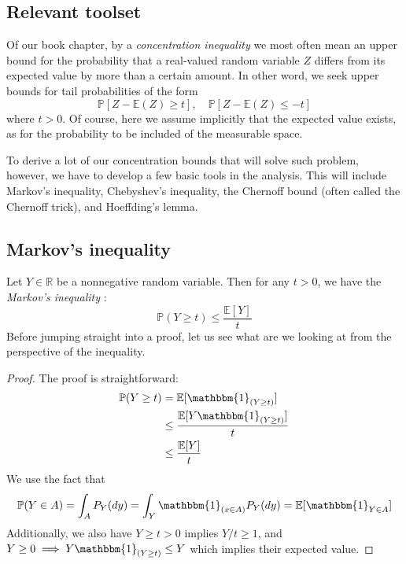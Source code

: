 \subsection{Relevant toolset}
Of our book chapter, by a \textit{concentration inequality} we most often mean an upper bound for the probability that a real-valued random variable $Z$ differs from its expected value by more than a certain amount. In other word, we seek upper bounds for tail probabilities of the form 
\begin{equation}
    \mathbb{P}[Z-\mathbb{E}(Z)\geq t], \quad \mathbb{P}[Z-\mathbb{E}(Z)\leq -t] 
\end{equation}
where $t>0$. Of course, here we assume implicitly that the expected value exists, as for the probability to be included of the measurable space. 

To derive a lot of our concentration bounds that will solve such problem, however, we have to develop a few basic tools in the analysis. This will include Markov's inequality, Chebyshev's inequality, the Chernoff bound (often called the Chernoff trick), and Hoeffding's lemma. 
\subsection{Markov's inequality}
Let $Y\in \mathbb{R}$ be a nonnegative random variable. Then for any $t> 0$, we have the \textit{Markov's inequality} : 
\begin{equation}
    \mathbb{P}(Y\geq t) \leq \frac{\mathbb{E}[Y]}{t}
\end{equation}
Before jumping straight into a proof, let us see what are we looking at from the perspective of the inequality.
\begin{proof}
    The proof is straightforward: \begin{equation}
        \begin{split}
            \mathbb{P}(Y\geq t) & = \mathbb{E}[\mathbbm{1}_{(Y\geq t)}]\\
            & \leq \frac{\mathbb{E}[Y\mathbbm{1}_{(Y\geq t)}]}{t}\\
            & \leq \frac{\mathbb{E}[Y]}{t}
        \end{split}
    \end{equation}
    We use the fact that\begin{equation}
        \mathbb{P}(Y\in A) = \int_{A} P_{Y} (dy) = \int_{Y} \mathbbm{1}_{(x\in A)} P_{Y}(dy) = \mathbb{E}[\mathbbm{1}_{Y\in A}]
    \end{equation}
    Additionally, we also have $Y\geq t > 0$ implies $Y/t \geq 1$, and $Y\geq 0\implies Y \mathbbm{1}_{(Y\geq t)}\leq Y$ which implies their expected value.
\end{proof}

